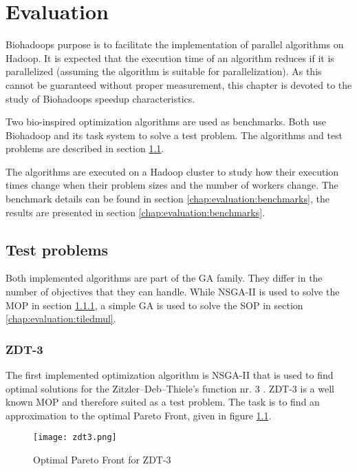 \chapter{Evaluation}
\label{chap:evaluation}
Biohadoops purpose is to facilitate the implementation of parallel algorithms on Hadoop. It is expected that the execution time of an algorithm reduces if it is parallelized (assuming the algorithm is suitable for parallelization). As this cannot be guaranteed without proper measurement, this chapter is devoted to the study of Biohadoops speedup characteristics.

Two bio-inspired optimization algorithms are used as benchmarks. Both use Biohadoop and its task system to solve a test problem. The algorithms and test problems are described in section \ref{chap:evaluation:testproblems}.

The algorithms are executed on a Hadoop cluster to study how their execution times change when their problem sizes and the number of workers change. The benchmark details can be found in section \ref{chap:evaluation:benchmarks}, the results are presented in section \ref{chap:evaluation:benchmarks}.

\section{Test problems}
\label{chap:evaluation:testproblems}
Both implemented algorithms are part of the GA family. They differ in the number of objectives that they can handle. While NSGA-II is used to solve the MOP in section \ref{chap:evaluation:zdt3}, a simple GA is used to solve the SOP in section \ref{chap:evaluation:tiledmul}.

\subsection{ZDT-3}
\label{chap:evaluation:zdt3}
The first implemented optimization algorithm is NSGA-II that is used to find optimal solutions for the Zitzler–Deb–Thiele's function nr. 3 \cite{zitzler2000comparison}. ZDT-3 is a well known MOP and therefore suited as a test problem. The task is to find an approximation to the optimal Pareto Front, given in figure \ref{fig:zdt3}.

\begin{figure}[ht!]
  \centering
  \texttt{[image: zdt3.png]}
  \caption{Optimal Pareto Front for ZDT-3}
  \label{fig:zdt3}
\end{figure}

